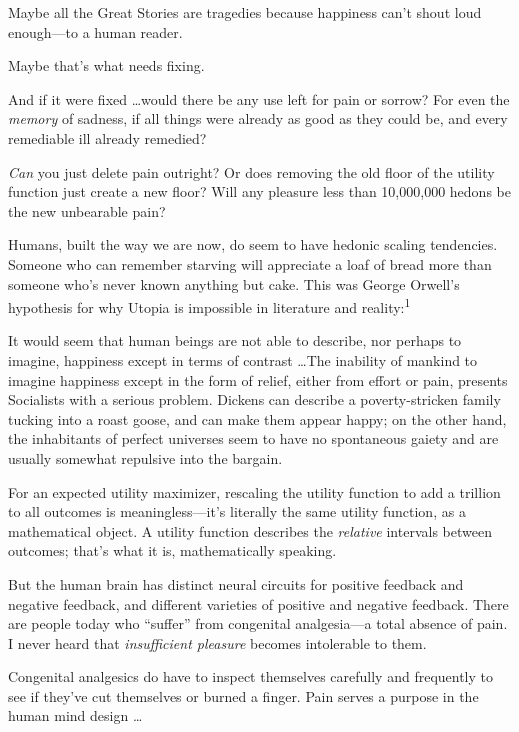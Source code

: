 {
 Maybe all the Great Stories are tragedies because happiness
can't shout loud enough---to a human reader.}

{
 Maybe that's what needs fixing.}

{
 And if it were fixed \ldots would there be any use left for pain or
sorrow? For even the \textit{memory} of sadness, if all things were
already as good as they could be, and every remediable ill already
remedied?}

{
 \textit{Can} you just delete pain outright? Or does removing the
old floor of the utility function just create a new floor? Will any
pleasure less than 10,000,000 hedons be the new unbearable pain?}

{
 Humans, built the way we are now, do seem to have hedonic scaling
tendencies. Someone who can remember starving will appreciate a loaf of
bread more than someone who's never known anything but
cake. This was George Orwell's hypothesis for why
Utopia is impossible in literature and reality:\textsuperscript{1}}

{
 It would seem that human beings are not able to describe, nor
perhaps to imagine, happiness except in terms of contrast \ldots The
inability of mankind to imagine happiness except in the form of relief,
either from effort or pain, presents Socialists with a serious problem.
Dickens can describe a poverty-stricken family tucking into a roast
goose, and can make them appear happy; on the other hand, the
inhabitants of perfect universes seem to have no spontaneous gaiety and
are usually somewhat repulsive into the bargain.}

{
 For an expected utility maximizer, rescaling the utility function
to add a trillion to all outcomes is meaningless---it's
literally the same utility function, as a mathematical object. A
utility function describes the \textit{relative} intervals between
outcomes; that's what it is, mathematically speaking.}

{
 But the human brain has distinct neural circuits for positive
feedback and negative feedback, and different varieties of positive and
negative feedback. There are people today who
``suffer'' from congenital
analgesia---a total absence of pain. I never heard that
\textit{insufficient pleasure} becomes intolerable to them.}

{
 Congenital analgesics do have to inspect themselves carefully and
frequently to see if they've cut themselves or burned a
finger. Pain serves a purpose in the human mind design \ldots}

